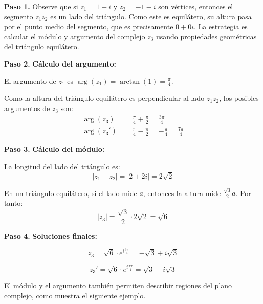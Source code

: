 \begin{example}
\begin{myproof}
\textbf{Paso 1.} Observe que si $z_1 = 1+i$ y $z_2 = -1-i$ son vértices, entonces el segmento $\overline{z_1z_2}$ es un lado del triángulo. Como este es equilátero, su altura pasa por el punto medio del segmento, que es precisamente $0+0i$. La estrategia es calcular el módulo y argumento del complejo $z_3$ usando propiedades geométricas del triángulo equilátero.

\textbf{Paso 2.} \textbf{Cálculo del argumento:}

El argumento de $z_1$ es $\arg(z_1) = \arctan(1) = \frac{\pi}{4}$.

Como la altura del triángulo equilátero es perpendicular al lado $\overline{z_1z_2}$, los posibles argumentos de $z_3$ son:
\begin{align}
\arg(z_3) &= \frac{\pi}{4} + \frac{\pi}{2} = \frac{3\pi}{4}\\
\arg(z_3') &= \frac{\pi}{4} - \frac{\pi}{2} = -\frac{\pi}{4} = \frac{7\pi}{4}
\end{align}

\textbf{Paso 3.} \textbf{Cálculo del módulo:}

La longitud del lado del triángulo es:
$$|z_1 - z_2| = |2 + 2i| = 2\sqrt{2}$$

En un triángulo equilátero, si el lado mide $a$, entonces la altura mide $\frac{\sqrt{3}}{2}a$. Por tanto:
$$|z_3| = \frac{\sqrt{3}}{2} \cdot 2\sqrt{2} = \sqrt{6}$$

\textbf{Paso 4.} \textbf{Soluciones finales:}

$$\boxed{z_3 = \sqrt{6} \cdot e^{i\frac{3\pi}{4}} = -\sqrt{3} + i\sqrt{3}}$$

$$\boxed{z_3' = \sqrt{6} \cdot e^{i\frac{7\pi}{4}} = \sqrt{3} - i\sqrt{3}}$$

\end{myproof}
\end{example}

El módulo y el argumento también permiten describir regiones del plano complejo, como muestra el siguiente ejemplo.


